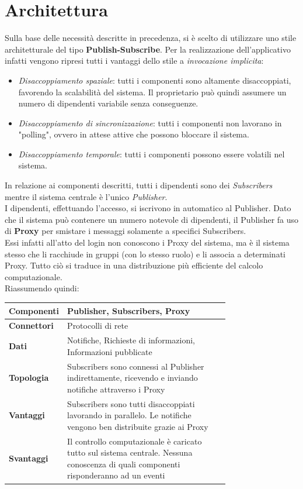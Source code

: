 \section{Architettura}
Sulla base delle necessità descritte in precedenza, si è scelto di utilizzare uno stile architetturale del tipo \textbf{Publish-Subscribe}. Per la realizzazione dell'applicativo infatti vengono ripresi tutti i vantaggi dello stile a \textit{invocazione implicita}:
\begin{itemize}
	\item \textit{Disaccoppiamento spaziale}: tutti i componenti sono altamente disaccoppiati, favorendo la scalabilità del sistema. Il proprietario può quindi assumere un numero di dipendenti variabile senza conseguenze.
	\item \textit{Disaccoppiamento di sincronizzazione}: tutti i componenti non lavorano in "polling", ovvero in attese attive che possono bloccare il sistema.
	\item \textit{Disaccoppiamento temporale}: tutti i componenti possono essere volatili nel sistema.
\end{itemize}
In relazione ai componenti descritti, tutti i dipendenti sono dei \textit{Subscribers} mentre il sistema centrale è l'unico \textit{Publisher}.
\\I dipendenti, effettuando l'accesso, si iscrivono in automatico al Publisher.
Dato che il sistema può contenere un numero notevole di dipendenti, il Publisher fa uso di \textbf{Proxy} per smistare i messaggi solamente a specifici Subscribers.
\\Essi infatti all'atto del login non conoscono i Proxy del sistema, ma è il sistema stesso che li racchiude in gruppi (con lo stesso ruolo) e li associa a determinati Proxy. Tutto ciò si traduce in una distribuzione più efficiente del calcolo computazionale.
\\Riassumendo quindi:
\begin{table}[H]
	\centering
	\begin{tabular}{|l | p{0.75\linewidth} |}
		\hline
		\textbf{Componenti} & Publisher, Subscribers, 
		Proxy \\
		\hline
		\textbf{Connettori} & Protocolli di rete \\
		\hline
		\textbf{Dati} & Notifiche, Richieste di informazioni, Informazioni pubblicate \\
		\hline
		\textbf{Topologia} & Subscribers sono connessi al Publisher indirettamente, ricevendo e inviando notifiche attraverso i Proxy \\
		\hline
		\textbf{Vantaggi} & Subscribers sono tutti disaccoppiati lavorando in parallelo. Le notifiche vengono ben distribuite grazie ai Proxy \\
		\hline
		\textbf{Svantaggi} & Il controllo computazionale è caricato tutto sul sistema centrale. Nessuna conoscenza di quali componenti risponderanno ad un eventi \\
		\hline
	\end{tabular}
\end{table}


